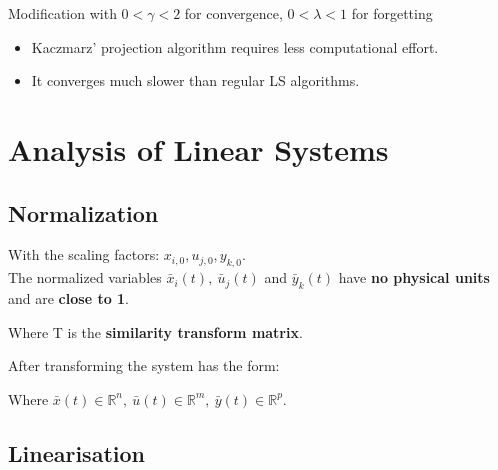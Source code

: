 \documentclass[10pt,a4paper]{scrartcl}
\begin{document}
\begin{multicols*}{3}
Modification with $0<\gamma<2$ for convergence, $0<\lambda<1$ for forgetting


\begin{itemize}
\item Kaczmarz' projection algorithm requires less computational effort.
\item It converges much slower than regular LS algorithms.
\end{itemize}

\vfill
\null
\newpage

\section{Analysis of Linear Systems}

\subsection{Normalization}


With the scaling factors: $x_{i,0},u_{j,0},y_{k,0}$. \\
The normalized variables $\bar{x}_i(t),\ \bar{u}_j(t)$ and $\bar{y}_k(t)$ have \textbf{no physical units} and are \textbf{close to 1}.


Where T is the \textbf{similarity transform matrix}.

After transforming the system has the form:


Where $\bar{x}(t)\in\mathbb{R}^n,\ \bar{u}(t)\in\mathbb{R}^m,\ \bar{y}(t)\in\mathbb{R}^p$.

\subsection{Linearisation}



\end{multicols*}
\end{document}
